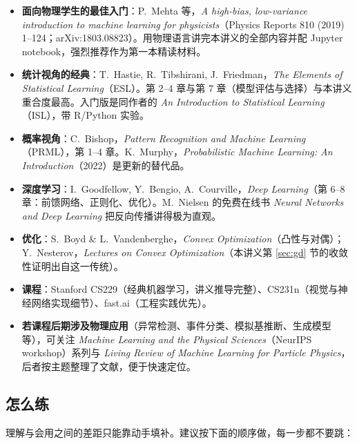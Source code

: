 \documentclass[UTF8,a4paper,11pt]{ctexart}
\theoremstyle{definition}
\theoremstyle{plain}
\theoremstyle{remark}
\begin{document}
\begin{itemize}
  \item \textbf{面向物理学生的最佳入门}：P.~Mehta 等，\emph{A high-bias, low-variance introduction to machine learning for physicists}（Physics Reports 810 (2019) 1--124；arXiv:1803.08823）。用物理语言讲完本讲义的全部内容并配 Jupyter notebook，强烈推荐作为第一本精读材料。
  \item \textbf{统计视角的经典}：T.~Hastie, R.~Tibshirani, J.~Friedman，\emph{The Elements of Statistical Learning}（ESL）。第 2--4 章与第 7 章（模型评估与选择）与本讲义重合度最高。入门版是同作者的 \emph{An Introduction to Statistical Learning}（ISL），带 R/Python 实验。
  \item \textbf{概率视角}：C.~Bishop，\emph{Pattern Recognition and Machine Learning}（PRML），第 1--4 章。K.~Murphy，\emph{Probabilistic Machine Learning: An Introduction}（2022）是更新的替代品。
  \item \textbf{深度学习}：I.~Goodfellow, Y.~Bengio, A.~Courville，\emph{Deep Learning}（第 6--8 章：前馈网络、正则化、优化）。M.~Nielsen 的免费在线书 \emph{Neural Networks and Deep Learning} 把反向传播讲得极为直观。
  \item \textbf{优化}：S.~Boyd \& L.~Vandenberghe，\emph{Convex Optimization}（凸性与对偶）；Y.~Nesterov，\emph{Lectures on Convex Optimization}（本讲义第 \ref{sec:gd} 节的收敛性证明出自这一传统）。
  \item \textbf{课程}：Stanford CS229（经典机器学习，讲义推导完整）、CS231n（视觉与神经网络实现细节）、fast.ai（工程实践优先）。
  \item \textbf{若课程后期涉及物理应用}（异常检测、事件分类、模拟基推断、生成模型等），可关注 \emph{Machine Learning and the Physical Sciences}（NeurIPS workshop）系列与 \emph{Living Review of Machine Learning for Particle Physics}，后者按主题整理了文献，便于快速定位。
\end{itemize}

\subsection{怎么练}

理解与会用之间的差距只能靠动手填补。建议按下面的顺序做，每一步都不要跳：
\end{document}
